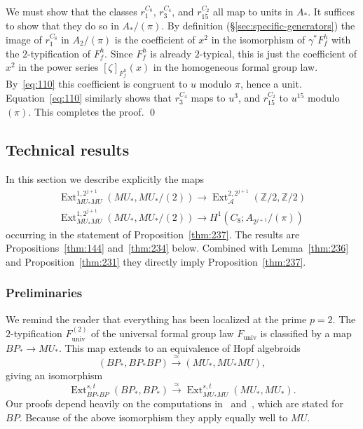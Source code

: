 \documentclass{amsart}
\theoremstyle{definition}
\theoremstyle{remark}
\newenvironment{pf}{\bigskip{\em Proof:\/}}{\qed\medskip}
\newcommand{\ext}{\operatorname{Ext}}
\newcommand{\Z}{{\mathbb Z}}
\newcommand{\zt}{C_{2}}
\newcommand{\ze}{C_{8}}
\newcommand{\zf}{C_{4}}
\newcommand{\bpstarbp}{BP_{\ast}BP}
\newcommand{\bpstar}{BP_{\ast}}
\newcommand{\mustarmu}{MU_{\ast}MU}
\newcommand{\mustar}{MU_{\ast}}
\newcommand{\funiv}{F_{\text{univ}}}
\newcommand{\sta}{\mathcal A}
\newcommand{\ltgroup}{F_{f}}
\begin{document}
\begin{pf}
We must show that the classes $r_{1}^{\ze}$, $r_{3}^{\zf}$, and
$r_{15}^{\zt}$ all map to units in $A_{\ast}$.  It suffices to show
that they do so in $A_{\ast}/(\pi)$.  By definition
(\S\ref{sec:specific-generators}) the image of $r_{1}^{\ze}$ in
$A_{2}/(\pi)$ is the coefficient of $x^{2}$ in the isomorphism of
$\gamma^{\ast}\ltgroup^{h}$ with the $2$-typification of $\ltgroup^{h}$.  Since
$\ltgroup^{h}$ is already $2$-typical, this is just the coefficient of
$x^{2}$ in the power series $[\zeta]_{\ltgroup^{h}}(x)$ in the
homogeneous formal group law.  By~\eqref{eq:110} this coefficient is
congruent to $u$ modulo $\pi$, hence a unit.  Equation~\eqref{eq:110}
similarly shows that $r_{3}^{\zf}$ maps to $u^{3}$, and $r_{15}^{\zt}$
to $u^{15}$ modulo $(\pi)$.  This completes the proof.
\end{pf}

\subsection{Technical results}
\label{sec:technical-results}

In this section we describe explicitly the maps 
\begin{equation}
\label{eq:157}
\begin{gathered}
\ext^{1,2^{j+1}}_{\mustarmu}(\mustar,\mustar/(2)) \to
\ext_{\sta}^{2,2^{j+1}}(\Z/2,\Z/2)  \\
\ext^{1,2^{j+1}}_{\mustarmu}(\mustar,\mustar/(2)) \to H^{1}(\ze;A_{2^{j+1}}/(\pi))
\end{gathered}
\end{equation}
occurring in the statement of Proposition~\ref{thm:237}.  The results are
Propositions~\ref{thm:144} and~\ref{thm:234} below.  Combined with
Lemma~\ref{thm:236} and Proposition~\ref{thm:231} they directly imply
Proposition~\ref{thm:237}.


\subsubsection{Preliminaries}
\label{sec:preliminaries}

We remind the reader that everything has been localized at the prime
$p=2$.  The $2$-typification $\funiv^{(2)}$ of the universal formal
group law $\funiv$ is classified by a map $\bpstar\to\mustar$.  This
map extends to an equivalence of Hopf algebroids
\[
(\bpstar, \bpstarbp) \xrightarrow{\approx}{} (\mustar,\mustarmu),
\]
giving an isomorphism
\begin{equation}
\label{eq:88}
\ext^{s,t}_{\bpstarbp}(\bpstar,\bpstar)\xrightarrow{\approx}{}
\ext^{s,t}_{\mustarmu}(\mustar,\mustar).
\end{equation}
Our proofs depend heavily on the computations in~\cite{MRW}
and~\cite{shimomura81:_novik_rm_ext_sp2_at_prime}, which are stated
for $BP$.  Because of the above isomorphism they apply equally well to
$MU$.
\end{document}
